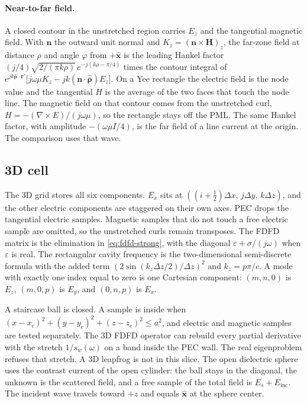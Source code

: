 \documentclass[11pt,a4paper]{article}
\begin{document}
\paragraph{Near-to-far field.}
A closed contour in the unstretched region carries $E_z$ and the
tangential magnetic field. With $\mathbf{n}$ the outward unit normal
and $K_z=(\mathbf{n}\times\mathbf{H})_z$, the far-zone field at distance
$\rho$ and angle $\varphi$ from $+\hat{\mathbf{x}}$ is the leading
Hankel factor
$(j/4)\sqrt{2/(\pi k\rho)}\,e^{-j(k\rho-\pi/4)}$ times the contour
integral of
$e^{jk\hat{\boldsymbol{\rho}}\cdot\mathbf{r}'}\bigl[j\omega\mu K_z
- jk(\mathbf{n}\cdot\hat{\boldsymbol{\rho}})E_z\bigr]$.
On a Yee rectangle the electric field is the node value and the
tangential $H$ is the average of the two faces that touch the node
line. The magnetic field on that contour comes from the unstretched
curl, $H=-(\nabla\times E)/(j\omega\mu)$, so the rectangle stays off
the PML. The same Hankel factor, with amplitude $-(\omega\mu I/4)$, is
the far field of a line current at the origin. The comparison uses that
wave.

\subsection{3D cell}
\label{sec:cell3d}

The 3D grid stores all six components. $E_x$ sits at
$((i+\tfrac12)\Delta x,\, j\Delta y,\, k\Delta z)$, and the other electric
components are staggered on their own axes. PEC drops the tangential
electric samples. Magnetic samples that do not touch a free electric
sample are omitted, so the unstretched curls remain transposes. The FDFD
matrix is the elimination in \eqref{eq:fdfd-strong}, with the diagonal
$\varepsilon+\sigma/(j\omega)$ when $\varepsilon$ is real. The rectangular
cavity frequency is the two-dimensional semi-discrete formula with the
added term $(2\sin(k_z\Delta z/2)/\Delta z)^2$ and $k_z=p\pi/c$. A mode
with exactly one index equal to zero is one Cartesian component:
$(m,n,0)$ is $E_z$, $(m,0,p)$ is $E_y$, and $(0,n,p)$ is $E_x$.

A staircase ball is closed. A sample is inside when
$(x-x_c)^2+(y-y_c)^2+(z-z_c)^2\le a^2$, and electric and magnetic samples
are tested separately. The 3D FDFD operator can rebuild every partial
derivative with the stretch $1/s_w(\omega)$ on a band inside the PEC wall.
The real eigenproblem refuses that stretch. A 3D leapfrog is not in this
slice. The open dielectric sphere uses the contrast current of the open
cylinder: the ball stays in the diagonal, the unknown is the scattered
field, and a free sample of the total field is $E_s+E_{\mathrm{inc}}$.
The incident wave travels toward $+z$ and equals $\hat{\mathbf{x}}$ at the
sphere center.
\end{document}
